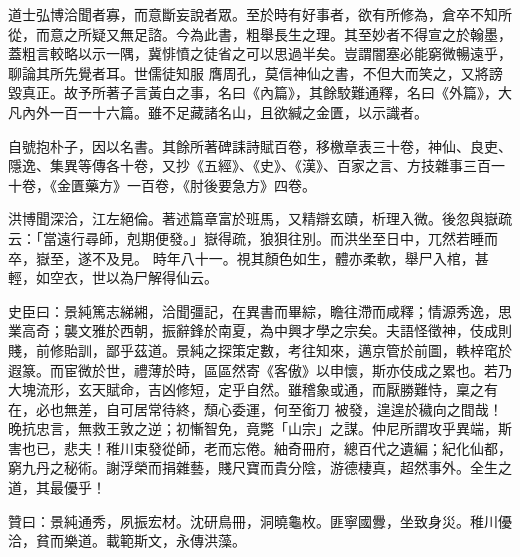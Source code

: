 \begin{pinyinscope}
 道士弘博洽聞者寡，而意斷妄說者眾。至於時有好事者，欲有所修為，倉卒不知所從，而意之所疑又無足諮。今為此書，粗舉長生之理。其至妙者不得宣之於翰墨，蓋粗言較略以示一隅，冀悱憤之徒省之可以思過半矣。豈謂闇塞必能窮微暢遠乎，聊論其所先覺者耳。世儒徒知服
 膺周孔，莫信神仙之書，不但大而笑之，又將謗毀真正。故予所著子言黃白之事，名曰《內篇》，其餘駮難通釋，名曰《外篇》，大凡內外一百一十六篇。雖不足藏諸名山，且欲緘之金匱，以示識者。



 自號抱朴子，因以名書。其餘所著碑誄詩賦百卷，移檄章表三十卷，神仙、良吏、隱逸、集異等傳各十卷，又抄《五經》、《史》、《漢》、百家之言、方技雜事三百一十卷，《金匱藥方》一百卷，《肘後要急方》四卷。



 洪博聞深洽，江左絕倫。著述篇章富於班馬，又精辯玄賾，析理入微。後忽與嶽疏云：「當遠行尋師，剋期便發。」嶽得疏，狼狽往別。而洪坐至日中，兀然若睡而卒，嶽至，遂不及見。
 時年八十一。視其顏色如生，體亦柔軟，舉尸入棺，甚輕，如空衣，世以為尸解得仙云。



 史臣曰：景純篤志綈緗，洽聞彊記，在異書而畢綜，瞻往滯而咸釋；情源秀逸，思業高奇；襲文雅於西朝，振辭鋒於南夏，為中興才學之宗矣。夫語怪徵神，伎成則賤，前修貽訓，鄙乎茲道。景純之探策定數，考往知來，邁京管於前圖，軼梓窀於遐篆。而宦微於世，禮薄於時，區區然寄《客傲》以申懷，斯亦伎成之累也。若乃大塊流形，玄天賦命，吉凶修短，定乎自然。雖稽象或通，而厭勝難恃，稟之有在，必也無差，自可居常待終，頹心委運，何至銜刀
 被發，遑遑於穢向之間哉！晚抗忠言，無救王敦之逆；初慚智免，竟斃「山宗」之謀。仲尼所謂攻乎異端，斯害也已，悲夫！稚川束發從師，老而忘倦。紬奇冊府，總百代之遺編；紀化仙都，窮九丹之秘術。謝浮榮而捐雜藝，賤尺寶而貴分陰，游德棲真，超然事外。全生之道，其最優乎！



 贊曰：景純通秀，夙振宏材。沈研鳥冊，洞曉龜枚。匪寧國釁，坐致身災。稚川優洽，貧而樂道。載範斯文，永傳洪藻。



\end{pinyinscope}